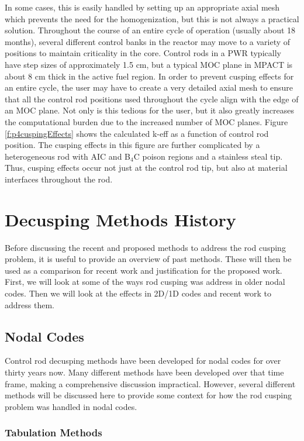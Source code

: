 In some cases, this is easily handled by setting up an appropriate axial mesh which prevents the need for the homogenization, but this is not always a practical solution.  Throughout the course of an entire cycle of operation (usually about 18 months), several different control banks in the reactor may move to a variety of positions to maintain criticality in the core.  Control rods in a PWR typically have step sizes of approximately 1.5 cm, but a typical MOC plane in MPACT is about 8 cm thick in the active fuel region.  In order to prevent cusping effects for an entire cycle, the user may have to create a very detailed axial mesh to ensure that all the control rod positions used throughout the cycle align with the edge of an MOC plane.  Not only is this tedious for the user, but it also greatly increases the computational burden due to the increased number of MOC planes.  Figure \ref{f:p4cuspingEffects} shows the calculated k-eff as a function of control rod position.  The cusping effects in this figure are further complicated by a heterogeneous rod with AIC and B$_4$C poison regions and a stainless steal tip.  Thus, cusping effects occur not just at the control rod tip, but also at material interfaces throughout the rod.

\section{Decusping Methods History}

Before discussing the recent and proposed methods to address the rod cusping problem, it is useful to provide an overview of past methods.  These will then be used as a comparison for recent work and justification for the proposed work.  First, we will look at some of the ways rod cusping was address in older nodal codes.  Then we will look at the effects in 2D/1D codes and recent work to address them.

\subsection{Nodal Codes}

Control rod decusping methods have been developed for nodal codes for over thirty years now.  Many different methods have been developed over that time frame, making a comprehensive discussion impractical.  However, several different methods will be discussed here to provide some context for how the rod cusping problem was handled in nodal codes.

\subsubsection{Tabulation Methods}

